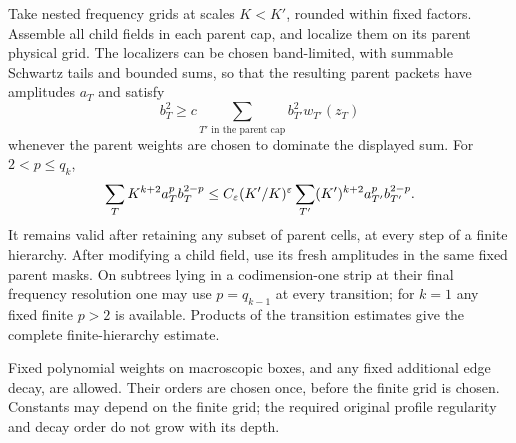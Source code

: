 \begin{proposition}\label{p:hierarchy}
Take nested frequency grids at scales $K<K'$, rounded within fixed factors.
Assemble all child fields in each parent cap, and localize them on its parent
physical grid.  The localizers can be chosen band-limited, with summable
Schwartz tails and bounded sums, so that the resulting parent packets have
amplitudes $a_T$ and satisfy
\begin{equation}\label{p:parent-weights}
 b_T^2\geq c\sum_{T'\text{ in the parent cap}}b_{T'}^2w_{T'}(z_T)
\end{equation}
whenever the parent weights are chosen to dominate the displayed sum.
For $2<p\leq q_k$,
\begin{equation}\label{p:hierarchy-equation}
 \sum_T K^{k+2}a_T^p b_T^{2-p}
 \leq C_\varepsilon(K'/K)^\varepsilon
 \sum_{T'}(K')^{k+2}a_{T'}^p b_{T'}^{2-p}.
\end{equation}
It remains valid after retaining any subset of parent cells, at every step
of a finite hierarchy.  After modifying a child field, use its fresh
amplitudes in the same fixed parent masks.  On subtrees lying in a
codimension-one strip at their final frequency resolution one may use
$p=q_{k-1}$ at every transition; for $k=1$ any fixed finite $p>2$ is
available.  Products of the transition estimates give the complete
finite-hierarchy estimate.

Fixed polynomial weights on macroscopic boxes, and any fixed additional
edge decay, are allowed.  Their orders are chosen once, before the finite
grid is chosen.  Constants may depend on the finite grid; the required
original profile regularity and decay order do not grow with its depth.
\end{proposition}
